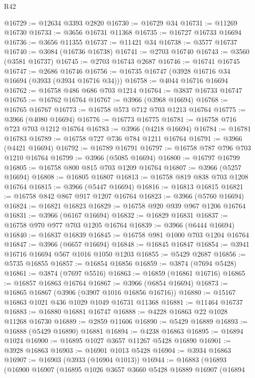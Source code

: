 \begin{lexlean}{R42}
\begin{coremodule}
@16729 := @12634 @3393 @2820
@16730 := @16729 @34
@16731 := @11269 @16730
@16733 := @3656 @16731 @11368
@16735 := @16727 @16733 @16694
@16736 := @3656 @11355
@16737 := @11421 @34
@16738 := @3577 @16737
@16740 := @3084 (@16736 @16738)
@16741 := @2703 @16740
@16743 := @3560 (@3581 @16737)
@16745 := @2703 @16743 @2687
@16746 := @16741 @16745
@16747 := @2686 @16746
@16756 := @16735 @16747 (@3928 @16716 @34 @16694 (@3933 (@3934 @16716 @34)))
@16758 := @4044 @16716 @16694
@16762 := @16758 @486 @686 @703 @1214
@16764 := @3837 @16733 @16747
@16765 := @16762 @16764
@16767 := @3966 (@3968 @16694)
@16768 := @16765 @16767
@16773 := @16758 @573 @712 @703 @1213 @16764
@16775 := @3966 (@4080 @16694)
@16776 := @16773 @16775
@16781 := @16758 @716 @723 @703 @1212 @16764
@16783 := @3966 (@4218 @16694)
@16784 := @16781 @16783
@16789 := @16758 @727 @736 @784 @1211 @16764
@16791 := @3966 (@4421 @16694)
@16792 := @16789 @16791
@16797 := @16758 @787 @796 @703 @1210 @16764
@16799 := @3966 (@5085 @16694)
@16800 := @16797 @16799
@16805 := @16758 @800 @815 @703 @1209 @16764
@16807 := @3966 (@5257 @16694)
@16808 := @16805 @16807
@16813 := @16758 @819 @838 @703 @1208 @16764
@16815 := @3966 (@5447 @16694)
@16816 := @16813 @16815
@16821 := @16758 @842 @867 @917 @1207 @16764
@16823 := @3966 (@5760 @16694)
@16824 := @16821 @16823
@16829 := @16758 @920 @939 @967 @1206 @16764
@16831 := @3966 (@6167 @16694)
@16832 := @16829 @16831
@16837 := @16758 @970 @977 @703 @1205 @16764
@16839 := @3966 (@6444 @16694)
@16840 := @16837 @16839
@16845 := @16758 @981 @1000 @703 @1204 @16764
@16847 := @3966 (@6657 @16694)
@16848 := @16845 @16847
@16854 := @3941 @16716 @16694 @567 @1016 @1050 @1203
@16855 := @5429 @2687
@16856 := @5735 @16855
@16857 := @16854 @16856
@16859 := @3874 (@7694 @5428)
@16861 := @3874 (@7697 @5516)
@16863 := @16859 (@16861 @16716)
@16865 := @16857 @16863 @16764
@16867 := @3966 (@6854 @16694)
@16873 := @16865 @16867 (@3906 (@3907 @1016 @16856 @16716))
@16880 := @15167 @16863 @1021 @436 @1029 @1049 @16731 @11368
@16881 := @11464 @16737
@16883 := @16880 @16881 @16747
@16888 := @4228 @16863 @22 @1028 @11268 @16730
@16889 := @2859 @11606
@16890 := @5429 @16889
@16893 := @16888 (@5429 @16890) @16881
@16894 := @4238 @16863
@16895 := @16894 @1024
@16900 := @16895 @1027 @3657 @11267 @5428 @16890
@16901 := @3928 @16863
@16903 := @16901 @1013 @5428
@16904 := @3934 @16863
@16907 := @16903 (@3933 (@16904 @1013))
@16944 := @16883
    (@16893
      (@16900
        @16907
        (@16895
          @1026
          @3657
          @3660
          @5428
          @16889
          @16907
          (@16894

\end{coremodule}
\end{lexlean}
